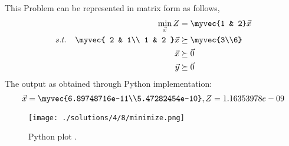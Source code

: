 This Problem can be represented in matrix form as follows,\\
    \begin{align}
        \min_{\vec{x}} Z &= \myvec{1 & 2}\vec{x}\\
        s.t. \quad 
        \myvec{
        2 & 1\\
        1 & 2
        }
        \vec{x} &\succeq \myvec{3\\6} \\
        \vec{x} &\succeq \vec{0}\\
        \vec{y} &\succeq \vec{0}
    \end{align}
The output as obtained through Python implementation:
\begin{align}
    \vec{x} = \myvec{6.89748716e-11\\5.47282454e-10}, Z = 1.16353978e-09
    \end{align}
 \begin{figure}
 \texttt{[image: ./solutions/4/8/minimize.png]}
  \caption{Python plot .}
  \label{eq:solutions/4/8/fig:Fig3}
 \end{figure}
